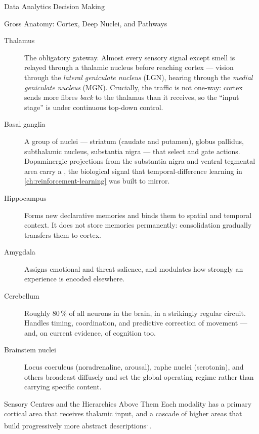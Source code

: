 \begin{v3topic}{Data Analytics Decision Making}
\begin{v3topic}{Gross Anatomy: Cortex, Deep Nuclei, and Pathways}
        \begin{description}
          \item[Thalamus] The obligatory gateway. Almost every sensory
            signal except smell is relayed through a thalamic nucleus before
            reaching cortex --- vision through the \emph{lateral geniculate
            nucleus} (LGN), hearing through the \emph{medial geniculate
            nucleus} (MGN). Crucially, the traffic is not one-way: cortex
            sends more fibres \emph{back} to the thalamus than it receives,
            so the ``input stage'' is under continuous top-down control.
          \item[Basal ganglia] A group of nuclei --- striatum (caudate and
            putamen), globus pallidus, subthalamic nucleus, substantia nigra
            --- that select and gate actions. Dopaminergic projections from
            the substantia nigra and ventral tegmental area carry a
            , the biological signal that
            temporal-difference learning in \cref{ch:reinforcement-learning}
            was built to mirror.
          \item[Hippocampus] Forms new declarative memories and binds them to
            spatial and temporal context. It does not store memories
            permanently: consolidation gradually transfers them to cortex.
          \item[Amygdala] Assigns emotional and threat salience, and modulates
            how strongly an experience is encoded elsewhere.
          \item[Cerebellum] Roughly $80\,\%$ of all neurons in the brain, in a
            strikingly regular circuit. Handles timing, coordination, and
            predictive correction of movement --- and, on current evidence,
            of cognition too.
          \item[Brainstem nuclei] Locus coeruleus (noradrenaline, arousal),
            raphe nuclei (serotonin), and others broadcast diffusely and set
            the global operating regime rather than carrying specific content.
        \end{description}
\end{v3topic}

\begin{v3topic}{Sensory Centres and the Hierarchies Above Them}
        Each modality has a primary cortical area that receives thalamic
        input, and a cascade of higher areas that build progressively more
        abstract descriptions\textsuperscript{\cite[][chs.~11--13]{purvesNeuroscience2018},
        \cite[][part~V]{kandelPrinciplesNeuralScience2021}}.


\end{v3topic}
\end{v3topic}
